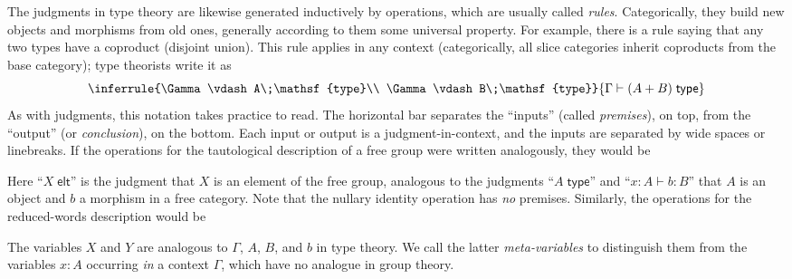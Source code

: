 \documentclass[12pt]{article}
\def\ty{\;\mathsf{type}}
\def\elt{\;\mathsf{elt}}
\def\types{\vdash}
\numberwithin{equation}{section}
\begin{document}
The judgments in type theory are likewise generated inductively by operations, which are usually called \emph{rules}.
Categorically, they build new objects and morphisms from old ones, generally according to them some universal property.
For example, there is a rule saying that any two types have a coproduct (disjoint union).
This rule applies in any context (categorically, all slice categories inherit coproducts from the base category);
type theorists write it as
\begin{equation}
  \inferrule{\Gamma \types A\ty \\ \Gamma\types B\ty}{\Gamma\types (A+B)\ty}\label{eq:coprod-form}
\end{equation}
As with judgments, this notation takes practice to read.
The horizontal bar separates the ``inputs'' (called \emph{premises}), on top, from the ``output'' (or \emph{conclusion}), on the bottom.
Each input or output is a judgment-in-context, and the inputs are separated by wide spaces or linebreaks.
%
If the operations for the tautological description of a free group were written analogously, they would be
Here ``$X \elt$'' is the judgment that $X$ is an element of the free group, analogous to the judgments ``$A\ty$'' and ``$x:A\types b:B$'' that $A$ is an object and $b$ a morphism in a free category.
Note that the nullary identity operation has \emph{no} premises.
Similarly, the operations for the reduced-words description would be

The variables $X$ and $Y$ are analogous to $\Gamma$, $A$, $B$, and $b$ in type theory.
We call the latter \emph{meta-variables} to distinguish them from the variables $x:A$ occurring \emph{in} a context $\Gamma$, which have no analogue in group theory.
\end{document}
